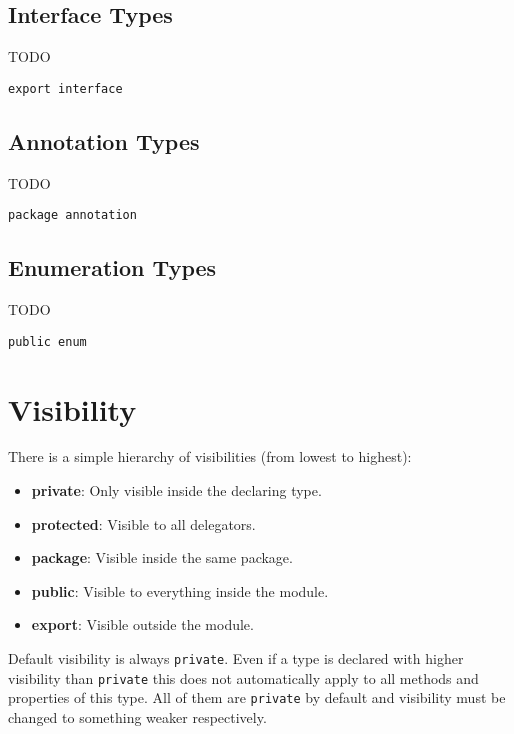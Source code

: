 \documentclass[11pt,a4paper]{report}
\begin{document}
\subsection{Interface Types}

TODO

\begin{lstlisting}[language=CayThe, title=foo/bar/Baz.ct]
export interface 
\end{lstlisting}


\subsection{Annotation Types}

TODO

\begin{lstlisting}[language=CayThe, title=foo/bar/Baz.ct]
package annotation 
\end{lstlisting}

\subsection{Enumeration Types}

TODO

\begin{lstlisting}[language=CayThe, title=foo/bar/Baz.ct]
public enum 
\end{lstlisting}

\section{Visibility}

There is a simple hierarchy of visibilities (from lowest to highest):

\begin{itemize}
    \item \textbf{private}: Only visible inside the declaring type.
    \item \textbf{protected}: Visible to all delegators.
    \item \textbf{package}: Visible inside the same package.
    \item \textbf{public}: Visible to everything inside the module.
    \item \textbf{export}: Visible outside the module.
\end{itemize}

Default visibility is always \texttt{private}. Even if a type is declared with higher visibility than \texttt{private} this does not automatically apply to all methods and properties of this type. All of them are \texttt{private} by default and visibility must be changed to something weaker respectively.
\end{document}
